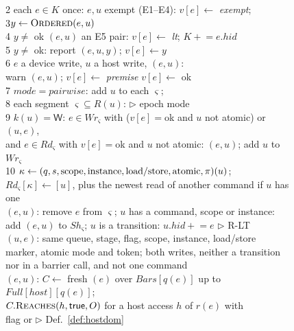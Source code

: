 \begin{figure}[tp]
\begin{minipage}[t]{0.49\textwidth}
\begin{tabbing}
2\> each $e \in K$ once:  $e,u$ exempt (E1--E4): $v[e] \gets$ \emph{exempt};  \\
3\>\>$y \gets \textsc{Ordered}(e,u)$ \\
4\>\> $y \ne$ ok  $(e,u)$ an E5 pair: $v[e] \gets$ \emph{lt}; $K \mathrel{+}= e.\mathit{hid}$ \\
5\>\> $y \ne$ ok: report $(e,u,y)$; $v[e] \gets y$ \\
6\>\> $e$ a device write, $u$ a host write,  $(e,u)$: \\
\>\>\>warn $(e,u)$; $v[e] \gets$ \emph{premise} \quad {} $v[e] \gets$ ok \\
7\> $\mathit{mode} = \mathit{pairwise}$: add $u$ to each $\varsigma$;  \\
8\> each segment $\varsigma \subseteq R(u)$: \hfill $\triangleright$ epoch mode \\
9\>\> $k(u) = \mathsf{W}$:  $e \in \mathit{Wr}_\varsigma$ with ($v[e]{=}$ok and $u$ not atomic) or $(u,e)$, \\
\>\>\>\>and $e \in \mathit{Rd}_\varsigma$ with $v[e]{=}$ok and $u$ not atomic: $(e,u)$; add $u$ to $\mathit{Wr}_\varsigma$ \\
10\>\> $\kappa \gets (q,s,\text{scope},\text{instance},\text{load/store},\text{atomic},\pi)(u)$; \\
\>\>\>$\mathit{Rd}_\varsigma[\kappa] \gets [u]$, plus the newest read of another command if $u$ has one \\
$(e,u)$: remove $e$ from $\varsigma$;  $u$ has a command, scope or instance: \\
\>\>add $(e,u)$ to $\mathit{Sh}_\varsigma$;  $u$ is a transition: $u.\mathit{hid} \mathrel{+}= e$ \hfill $\triangleright$ R-LT \\
$(u,e)$: same queue, stage, flag, scope, instance, load/store \\
\>marker, atomic mode and token; both writes, neither a transition \\
\>nor in a barrier call, and not one command \\
$(e,u)$: $C \gets$ fresh $(e)$ over $\mathit{Bars}[q(e)]$ up to $\mathit{Full}[\mathit{host}][q(e)]$; \\
\> $C.\textsc{Reaches}(h, \mathsf{true}, O)$ for a host access $h$ of $r(e)$ with \\
\>flag  or  \hfill $\triangleright$ Def.~\ref{def:hostdom}

\end{tabbing}
\end{minipage}
\end{figure}
